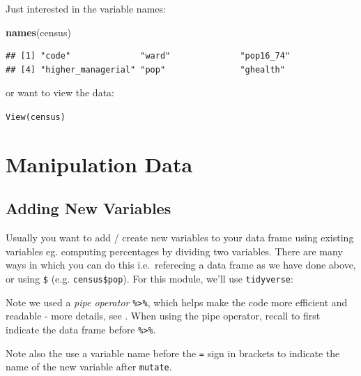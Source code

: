 \documentclass[]{book}
\newenvironment{Shaded}{\begin{snugshade}}{\end{snugshade}}
\newcommand{\KeywordTok}[1]{\textcolor[rgb]{0.13,0.29,0.53}{\textbf{#1}}}
\newcommand{\DataTypeTok}[1]{\textcolor[rgb]{0.13,0.29,0.53}{#1}}
\newcommand{\StringTok}[1]{\textcolor[rgb]{0.31,0.60,0.02}{#1}}
\newcommand{\OperatorTok}[1]{\textcolor[rgb]{0.81,0.36,0.00}{\textbf{#1}}}
\newcommand{\NormalTok}[1]{#1}
\begin{document}
Just interested in the variable names:

\begin{Shaded}
\begin{Highlighting}[]
\KeywordTok{names}\NormalTok{(census)}
\end{Highlighting}
\end{Shaded}

\begin{verbatim}
## [1] "code"              "ward"              "pop16_74"         
## [4] "higher_managerial" "pop"               "ghealth"
\end{verbatim}

or want to view the data:

\texttt{View(census)}

\section{Manipulation Data}\label{manipulation-data}

\subsection{Adding New Variables}\label{adding-new-variables}

Usually you want to add / create new variables to your data frame using
existing variables eg. computing percentages by dividing two variables.
There are many ways in which you can do this i.e.~referecing a data
frame as we have done above, or using \texttt{\$} (e.g.
\texttt{census\$pop}). For this module, we'll use \texttt{tidyverse}:

\begin{Shaded}
\end{Shaded}

Note we used a \emph{pipe operator} \texttt{\%\textgreater{}\%}, which
helps make the code more efficient and readable - more details, see
\citet{grolemund_wickham_2019_book}. When using the pipe operator,
recall to first indicate the data frame before
\texttt{\%\textgreater{}\%}.

Note also the use a variable name before the \texttt{=} sign in brackets
to indicate the name of the new variable after \texttt{mutate}.
\end{document}
